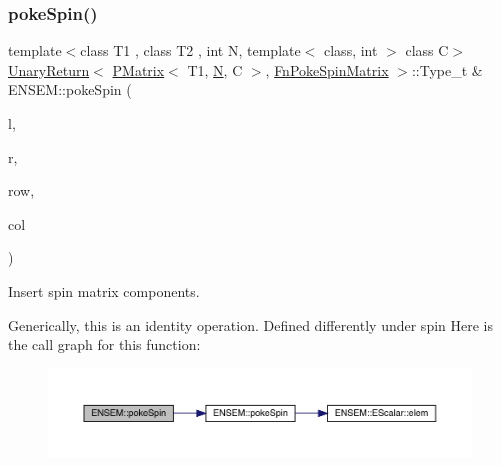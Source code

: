 \subsubsection{\texorpdfstring{pokeSpin()}{pokeSpin()}\hspace{0.1cm}{\footnotesize\ttfamily [2/2]}}
{\footnotesize\ttfamily template$<$class T1 , class T2 , int N, template$<$ class, int $>$ class C$>$ \\
\mbox{\hyperlink{structENSEM_1_1UnaryReturn}{Unary\+Return}}$<$ \mbox{\hyperlink{classENSEM_1_1PMatrix}{P\+Matrix}}$<$ T1, \mbox{\hyperlink{operator__name__util_8cc_a7722c8ecbb62d99aee7ce68b1752f337}{N}}, C $>$, \mbox{\hyperlink{structENSEM_1_1FnPokeSpinMatrix}{Fn\+Poke\+Spin\+Matrix}} $>$\+::Type\+\_\+t \& E\+N\+S\+E\+M\+::poke\+Spin (\begin{DoxyParamCaption}\item[{\mbox{\hyperlink{classENSEM_1_1PMatrix}{P\+Matrix}}$<$ T1, \mbox{\hyperlink{operator__name__util_8cc_a7722c8ecbb62d99aee7ce68b1752f337}{N}}, C $>$ \&}]{l,  }\item[{const \mbox{\hyperlink{classENSEM_1_1PMatrix}{P\+Matrix}}$<$ T2, \mbox{\hyperlink{operator__name__util_8cc_a7722c8ecbb62d99aee7ce68b1752f337}{N}}, C $>$ \&}]{r,  }\item[{int}]{row,  }\item[{int}]{col }\end{DoxyParamCaption})\hspace{0.3cm}{\ttfamily [inline]}}



Insert spin matrix components. 

Generically, this is an identity operation. Defined differently under spin Here is the call graph for this function\+:\nopagebreak
\begin{figure}[H]
\begin{center}
\leavevmode
\includegraphics[width=350pt]{df/d0a/group__primmatrix_gaf6f04aa80d2490f962a3132eb16fa98a_cgraph}
\end{center}
\end{figure}
\mbox{\label{group__primmatrix_ga95daf5fb6c2f089f11774d123f8795d5}} 
